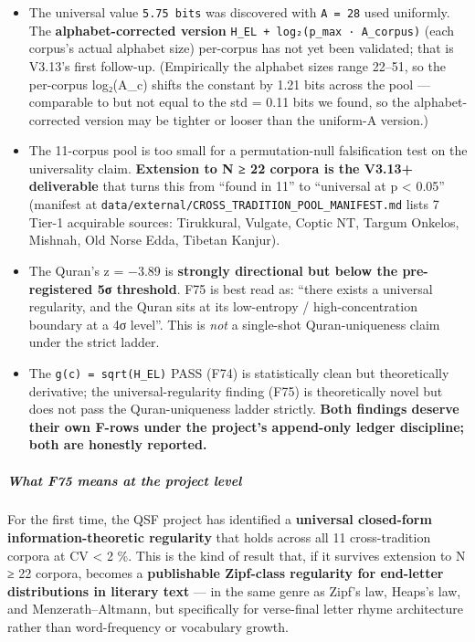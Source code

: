\documentclass[
]{article}
\providecommand{\tightlist}{%
  \setlength{\itemsep}{0pt}\setlength{\parskip}{0pt}}
\begin{document}
\begin{itemize}
\tightlist
\item
  The universal value \texttt{5.75\ bits} was discovered with
  \texttt{A\ =\ 28} used uniformly. The \textbf{alphabet-corrected
  version} \texttt{H\_EL\ +\ log₂(p\_max\ ·\ A\_corpus)} (each corpus's
  actual alphabet size) per-corpus has not yet been validated; that is
  V3.13's first follow-up. (Empirically the alphabet sizes range 22--51,
  so the per-corpus log₂(A\_c) shifts the constant by 1.21 bits across
  the pool --- comparable to but not equal to the std = 0.11 bits we
  found, so the alphabet-corrected version may be tighter or looser than
  the uniform-A version.)
\item
  The 11-corpus pool is too small for a permutation-null falsification
  test on the universality claim. \textbf{Extension to N ≥ 22 corpora is
  the V3.13+ deliverable} that turns this from ``found in 11'' to
  ``universal at p \textless{} 0.05'' (manifest at
  \texttt{data/external/CROSS\_TRADITION\_POOL\_MANIFEST.md} lists 7
  Tier-1 acquirable sources: Tirukkural, Vulgate, Coptic NT, Targum
  Onkelos, Mishnah, Old Norse Edda, Tibetan Kanjur).
\item
  The Quran's z = −3.89 is \textbf{strongly directional but below the
  pre-registered 5σ threshold}. F75 is best read as: ``there exists a
  universal regularity, and the Quran sits at its low-entropy /
  high-concentration boundary at a 4σ level''. This is \emph{not} a
  single-shot Quran-uniqueness claim under the strict ladder.
\item
  The \texttt{g(c)\ =\ sqrt(H\_EL)} PASS (F74) is statistically clean
  but theoretically derivative; the universal-regularity finding (F75)
  is theoretically novel but does not pass the Quran-uniqueness ladder
  strictly. \textbf{Both findings deserve their own F-rows under the
  project's append-only ledger discipline; both are honestly reported.}
\end{itemize}

\subparagraph{What F75 means at the project
level}\label{what-f75-means-at-the-project-level}

For the first time, the QSF project has identified a \textbf{universal
closed-form information-theoretic regularity} that holds across all 11
cross-tradition corpora at CV \textless{} 2 \%. This is the kind of
result that, if it survives extension to N ≥ 22 corpora, becomes a
\textbf{publishable Zipf-class regularity for end-letter distributions
in literary text} --- in the same genre as Zipf's law, Heaps's law, and
Menzerath--Altmann, but specifically for verse-final letter rhyme
architecture rather than word-frequency or vocabulary growth.
\end{document}
